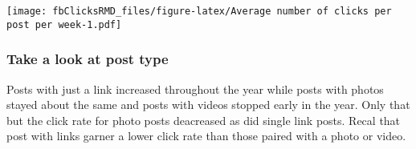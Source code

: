 \documentclass[
]{article}
\newenvironment{Shaded}{\begin{snugshade}}{\end{snugshade}}
\newcommand{\CommentTok}[1]{\textcolor[rgb]{0.56,0.35,0.01}{\textit{#1}}}
\newcommand{\DataTypeTok}[1]{\textcolor[rgb]{0.13,0.29,0.53}{#1}}
\newcommand{\KeywordTok}[1]{\textcolor[rgb]{0.13,0.29,0.53}{\textbf{#1}}}
\newcommand{\NormalTok}[1]{#1}
\newcommand{\OperatorTok}[1]{\textcolor[rgb]{0.81,0.36,0.00}{\textbf{#1}}}
\newcommand{\StringTok}[1]{\textcolor[rgb]{0.31,0.60,0.02}{#1}}
\begin{document}
\texttt{[image: fbClicksRMD\_files/figure-latex/Average number of clicks per post per week-1.pdf]}

\hypertarget{take-a-look-at-post-type}{%
\subsubsection{Take a look at post
type}\label{take-a-look-at-post-type}}

Posts with just a link increased throughout the year while posts with
photos stayed about the same and posts with videos stopped early in the
year. Only that but the click rate for photo posts deacreased as did
single link posts. Recal that post with links garner a lower click rate
than those paired with a photo or video.

\begin{Shaded}
\end{Shaded}
\end{document}
